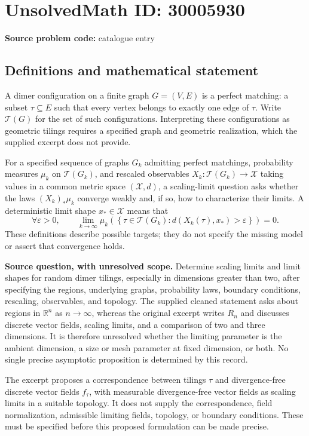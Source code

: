 \documentclass[11pt]{article}
\newcommand{\R}{\mathbb{R}}
\begin{document}
\section*{UnsolvedMath ID: 30005930}
\textbf{Source problem code:} catalogue entry
\subsection{Definitions and mathematical statement}
A dimer configuration on a finite graph \(G=(V,E)\) is a perfect matching: a subset \(\tau\subseteq E\) such that every vertex belongs to exactly one edge of \(\tau\). Write \(\mathcal T(G)\) for the set of such configurations. Interpreting these configurations as geometric tilings requires a specified graph and geometric realization, which the supplied excerpt does not provide.

For a specified sequence of graphs \(G_k\) admitting perfect matchings, probability measures \(\mu_k\) on \(\mathcal T(G_k)\), and rescaled observables \(X_k:\mathcal T(G_k)\to\mathcal X\) taking values in a common metric space \((\mathcal X,d)\), a scaling-limit question asks whether the laws \((X_k)_*\mu_k\) converge weakly and, if so, how to characterize their limits. A deterministic limit shape \(x_*\in\mathcal X\) means that
\[
\forall\varepsilon>0,\qquad
\lim_{k\to\infty}\mu_k\!\left(\left\{\tau\in\mathcal T(G_k):d(X_k(\tau),x_*)>\varepsilon\right\}\right)=0.
\]
These definitions describe possible targets; they do not specify the missing model or assert that convergence holds.

\textbf{Source question, with unresolved scope.} Determine scaling limits and limit shapes for random dimer tilings, especially in dimensions greater than two, after specifying the regions, underlying graphs, probability laws, boundary conditions, rescaling, observables, and topology. The supplied cleaned statement asks about regions in \(\R^n\) as \(n\to\infty\), whereas the original excerpt writes \(R_n\) and discusses discrete vector fields, scaling limits, and a comparison of two and three dimensions. It is therefore unresolved whether the limiting parameter is the ambient dimension, a size or mesh parameter at fixed dimension, or both. No single precise asymptotic proposition is determined by this record.

The excerpt proposes a correspondence between tilings \(\tau\) and divergence-free discrete vector fields \(f_\tau\), with measurable divergence-free vector fields as scaling limits in a suitable topology. It does not supply the correspondence, field normalization, admissible limiting fields, topology, or boundary conditions. These must be specified before this proposed formulation can be made precise.
\end{document}
